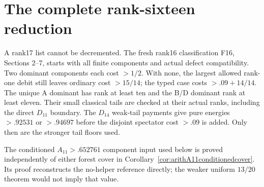 \documentclass[11pt]{article}
\newcommand{\supp}[1]{\textsf{#1}}
\begin{document}
\section{The complete rank-sixteen reduction}\label{sec:sixteen}

A rank17 list cannot be decremented. The fresh rank16 classification
\supp{F16}, Sections 2--7, starts with all finite components and
actual defect compatibility. Two dominant components each cost
$>1/2$. With none, the largest allowed rank-one debit still leaves
ordinary cost $>15/14$; the typed case costs $>.09+14/14$.
The unique A dominant has rank at least ten and the B/D dominant
rank at least eleven. Their small classical tails are checked at
their actual ranks, including the direct $D_{11}$ boundary.
The $D_{14}$ weak-tail payments give pure energies $>.92531$
or $>.94697$ before the disjoint spectator cost $>.09$ is added.
Only then are the stronger tail floors used.

The conditioned $A_{11}>.652761$ component input used below is proved
independently of either forest cover in
Corollary~\ref{cor:arithA11conditionedcover}. Its proof reconstructs the
no-helper reference directly; the weaker uniform $13/20$ theorem would
not imply that value.
\end{document}
